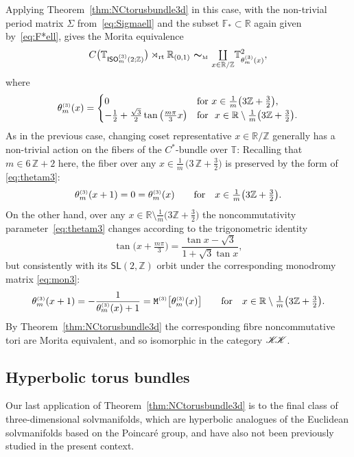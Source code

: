 \documentclass[10pt,a4paper]{amsart}
\numberwithin{equation}{section}
\newcommand{\Z}{\zed}
\newcommand{\F}{\mathbb{F}}
\newcommand{\mbf}[1]{{\boldsymbol {#1} }}
\newcommand{\CCK}{\mathscr{K}}
\newcommand{\sfSL}{\mathsf{SL}}
\newcommand{\ISO}{{\sf ISO}}
\newcommand{\rt}{{\rm rt}}
\newcommand{\mcoprod}{\mbox{$\coprod\limits_{x\in\R/\Z}$}}
\newcommand{\R}{\real}
\newcommand{\zed}{{\mathbb Z}} %
\newcommand{\real}{{\mathbb R}} %
\newcommand{\torus}{{\mathbb T}} %
\begin{document}
Applying Theorem~\ref{thm:NCtorusbundle3d} in this case, with the
non-trivial period matrix $\Sigma$ from~\eqref{eq:Sigmaell} and the
subset $\F_*\subset\R$ again given by~\eqref{eq:F*ell}, gives
 the Morita equivalence
\[
C\big(\torus_{\ISO^{\text{\tiny($3$)}}_m(2;\Z)}\big)\rtimes_\rt\real_{(0,1)}
\ \mbf\sim_{\text{\tiny M}} \ \mcoprod
\torus^2_{\theta^{\text{\tiny(3)}}_m(x)} ,
\]
where
\begin{gather}\label{eq:thetam3}
\theta_m^{\text{\tiny(3)}}(x) = \begin{cases}
 0 & \mbox{for} \ x \in
 \frac1{m} \big(3 \Z+\frac32\big) , \\
 -\frac12 + \frac{\sqrt3}2\tan\big(\frac{m \pi}3 x\big)
 & \mbox{for} \ \ x\in\R\setminus \frac1{m} \big(3 \Z+\frac32\big) . \end{cases}
\end{gather}
As in the previous case, changing coset representative
$x\in\R/\Z$ generally has a non-trivial action on the fibers of the
$C^*$-bundle over $\torus$: Recalling that $m\in 6\,\Z+2$ here, the
fiber over any $x\in\frac1m\,\big(3\,\Z+\frac32\big)$ is preserved by
the form of \eqref{eq:thetam3}:
\[
\theta_m^{\text{\tiny(3)}}(x+1) =
 0=\theta_m^{\text{\tiny(3)}}(x)
\qquad \mbox{for} \quad x\in\tfrac1m\big(3\Z +\tfrac32\big) .
\]
On the other hand, over any $x\in\R\setminus\frac1m\big(3\Z+\frac32\big)$
the noncommutativity parameter~\eqref{eq:thetam3} changes according to
the trigonometric identity
\[
\tan\big(x+\tfrac{m \pi}3\big) = \frac{\tan x-\sqrt3}{1+\sqrt3 \tan x} ,
\]
but consistently with its $\sfSL(2,\Z)$ orbit under the corresponding
monodromy matrix \eqref{eq:mon3}:
\[
\theta_m^{\text{\tiny(3)}}(x+1) =
-\frac1{\theta_m^{\text{\tiny(3)}}(x)+1} = {\tt
 M}^{\text{\tiny(3)}}\big[ \theta_m^{\text{\tiny(3)}}(x)\big] \qquad \mbox{for} \quad x\in\R\setminus\tfrac1m \big(3 \Z +\tfrac32\big).
\]
By Theorem~\ref{thm:NCtorusbundle3d} the corresponding fibre noncommutative tori are Morita
equivalent,
and so isomorphic in the category ${\CCK\hspace{-1mm}\CCK}$.

\subsection{Hyperbolic torus bundles}\label{sec:hyperbolicbundles}

Our last application of
Theorem~\ref{thm:NCtorusbundle3d} is to the final class of
three-dimensional solvmanifolds, which are
hyperbolic analogues of the Euclidean solvmanifolds based on the
Poincar\'e group, and have also not been
previously studied in the present context.
\end{document}
